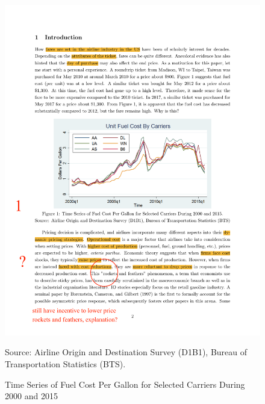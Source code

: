 \documentclass[12pt, letterpaper, oneside]{article}
\begin{document}
\begin{figure}[h!]
    \centering
    \begin{minipage}{0.72\textwidth}
        \begin{center}
            \captionsetup{justification=centering}
            \caption{Time Series of Fuel Cost Per Gallon for Selected Carriers During 2000 and 2015}
            \vspace*{-0.2cm}
            \includegraphics[scale=0.9]{photo.pdf}
        \end{center}
        \vspace*{-0.4cm}
        {\footnotesize  Source: Airline Origin and Destination Survey (D1B1), Bureau of Transportation Statistics (BTS). \par}
    \end{minipage}
\end{figure}
\end{document}
